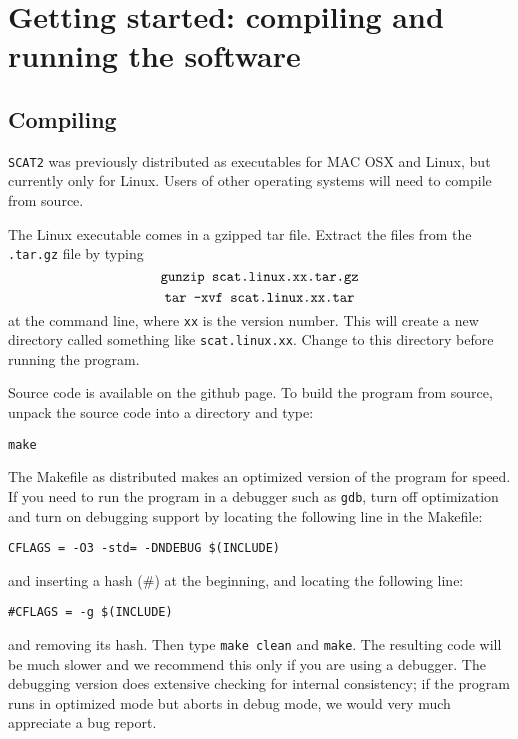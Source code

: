 \documentclass[10pt,titlepage,times,letterpaper]{article}
\def\SCAT{{\tt SCAT2} }
\begin{document}

\section{Getting started: compiling and running the software} \label{started}

\subsection{Compiling}

\SCAT was previously distributed as executables for MAC OSX and
Linux, but currently only for Linux.  Users of other operating systems
will need to compile from source.

The Linux executable comes in a gzipped tar file.
Extract the files from the {\tt .tar.gz} file by typing
$$\text{{\tt gunzip scat.linux.xx.tar.gz}}$$
$$\text{{\tt tar -xvf scat.linux.xx.tar}}$$
at the command line, where {\tt xx} is the version number.
This will create a new directory called something like
{\tt scat.linux.xx}. Change to this directory before
running the program.

Source code is available on the github page. 
To build the program from source, unpack the source code into a directory and type:

{\tt make}

The Makefile as distributed makes an optimized version of the program for speed.
If you need to run the program in a debugger such as {\tt gdb}, turn off optimization 
and turn on debugging support by locating the following line in the Makefile:

\begin{verbatim}
CFLAGS = -O3 -std= -DNDEBUG $(INCLUDE)
\end{verbatim}

and inserting a hash (\#) at the beginning, and locating the following line:

\begin{verbatim}
#CFLAGS = -g $(INCLUDE)
\end{verbatim}

and removing its hash.  Then type {\tt make clean} and {\tt make}.   
The resulting code will be much slower and we recommend this only if you 
are using a debugger.  The debugging version does extensive checking for internal
consistency; if the program runs in optimized mode but aborts in 
debug mode, we would very much appreciate a bug report.
\end{document}
